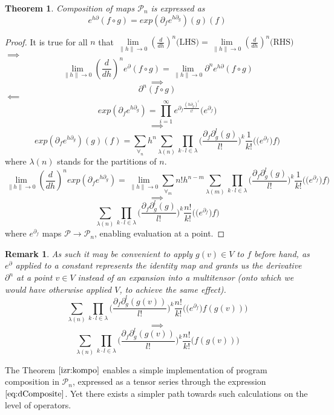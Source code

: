 \documentclass{article}
\newcommand{\dP}{\mathcal{P}}
\newcommand{\D}{\partial}
\newtheorem{izrek}{Theorem}[section]
\newtheorem{opomba}{Remark}[section]
\begin{document}
 \begin{izrek}\label{izr:kompo}
 Composition of maps $\dP_n$ is expressed as
 \begin{equation}
 e^{h\D}(f\circ g)=exp(\D_fe^{h\D_g})(g)(f)
 \end{equation}
 \end{izrek}
 
\begin{proof}
 It is true for all $n$ that $\lim\limits_{\lVert h\rVert\to 0}(\frac{d}{dh})^n\text{(LHS)}=\lim\limits_{\lVert h\rVert\to 0}(\frac{d}{dh})^n\text{(RHS)}$\\
 $\implies$
 $$\lim\limits_{\lVert h\rVert\to 0}(\frac{d}{dh})^ne^\D(f\circ g)=\lim\limits_{\lVert h\rVert\to 0}\D^ne^{h\D}(f\circ g)$$
 $$\implies$$
 $$\D^n(f\circ g)$$
 $\impliedby$
 $$exp(\D_fe^{h\D_g})=\prod_{i=1}^{\infty}e^{\D_f\frac{(h\D_g)^i}{i!}}\Big(e^{\D_f}\Big)$$
 $$\implies$$
 $$exp(\D_fe^{h\D_g})(g)(f)=\sum\limits_{\forall_n}h^n\sum\limits_{\lambda(n)}\prod\limits_{k\cdot l\in\lambda}\Big(\frac{\D_f\D_g^l(g)}{l!}\Big)^k\frac{1}{k!}\Big(\Big(e^{\D_f}\Big)f\Big)$$
 where $\lambda(n)$ stands for the partitions of $n$.
 $$\lim\limits_{\lVert h\rVert\to 0}(\frac{d}{dh})^nexp(\D_fe^{h\D_g})=\lim\limits_{\lVert h\rVert\to 0}\sum\limits_{\forall_m}n!h^{n-m}\sum\limits_{\lambda(m)}\prod\limits_{k\cdot l\in\lambda}\Big(\frac{\D_f\D_g^l(g)}{l!}\Big)^k\frac{1}{k!}\Big(\Big(e^{\D_f}\Big)f\Big)$$
 $$\implies$$
 \begin{equation}\label{eq:dComposite}
 \sum\limits_{\lambda(n)}\prod\limits_{k\cdot l\in\lambda}\Big(\frac{\D_f\D_g^l(g)}{l!}\Big)^k\frac{n!}{k!}\Big(\Big(e^{\D_f}\Big)f\Big)
 \end{equation}
 where $e^{\D_f}$ maps $\dP\to\dP_n$, enabling evaluation at a point. 
 \end{proof}       
 \begin{opomba}
 As such it may be convenient to apply $g(v)\in V$ to $f$ before hand, as $e^\D$ applied to a constant represents the identity map and grants us the derivative $\D^n$ at a point $v\in V$ instead of an expansion into a multitensor (onto which we would have otherwise applied $V$, to achieve the same effect).
  $$\sum\limits_{\lambda(n)}\prod\limits_{k\cdot l\in\lambda}\Big(\frac{\D_f\D_g^l(g(v))}{l!}\Big)^k\frac{n!}{k!}\Big(\Big(e^{\D_f}\Big)f(g(v))\Big)$$
  $$\implies$$
  \begin{equation}\label{eq:dCompositePoint}
  \sum\limits_{\lambda(n)}\prod\limits_{k\cdot l\in\lambda}\Big(\frac{\D_f\D_g^l(g(v))}{l!}\Big)^k\frac{n!}{k!}\Big(f(g(v))\Big)
  \end{equation}
 \end{opomba}
 The Theorem $\ref{izr:kompo}$ enables a simple implementation of program composition in $\dP_n$, expressed as a tensor series through the expression $\eqref{eq:dComposite}$. Yet there exists a simpler path towards such calculations on the level of operators. 
 
\end{document}
